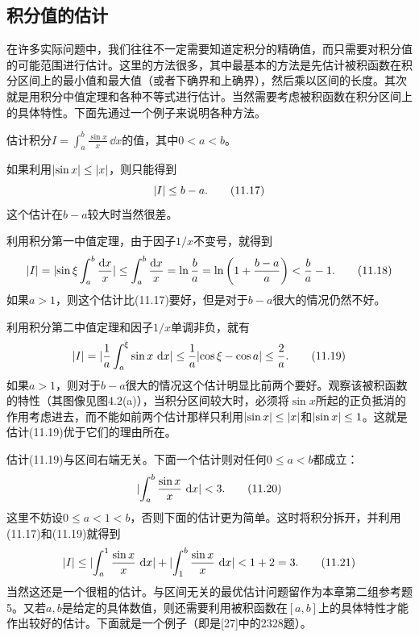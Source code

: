 \subsection{积分值的估计}

在许多实际问题中，我们往往不一定需要知道定积分的精确值，而只需要对积分值的可能范围进行估计。这里的方法很多，其中最基本的方法是先估计被积函数在积分区间上的最小值和最大值（或者下确界和上确界），然后乘以区间的长度。其次就是用积分中值定理和各种不等式进行估计。当然需要考虑被积函数在积分区间上的具体特性。下面先通过一个例子来说明各种方法。

\begin{xexample}[11.3.1]
估计积分$I=\int_a^b\frac{\sin x}{x}\,\dd x$的值，其中$0<a<b$。
\end{xexample}
\begin{xsolution}
如果利用$\lvert\sin x\rvert\le\lvert x\rvert$，则只能得到
\begin{equation}
  \lvert I\rvert\le b-a.
  \tag{11.17}
  \label{eq:11.17}
\end{equation}
这个估计在$b-a$较大时当然很差。

利用积分第一中值定理，由于因子$1/x$不变号，就得到
\begin{equation}
  \lvert I\rvert=\lvert\sin\xi\int_a^b\frac{\mathop{}\!\mathrm{d} x}{x}\rvert
  \le\int_a^b\frac{\mathop{}\!\mathrm{d} x}{x}=\ln\frac ba
  =\ln\left(1+\frac{b-a}{a}\right)<\frac ba-1.
  \tag{11.18}
  \label{eq:11.18}
\end{equation}
如果$a>1$，则这个估计比(11.17)要好，但是对于$b-a$很大的情况仍然不好。

利用积分第二中值定理和因子$1/x$单调非负，就有
\begin{equation}
  \lvert I\rvert=\lvert\frac1a\int_a^\xi\sin x\,\mathop{}\!\mathrm{d} x\rvert
  \le\frac1a\lvert\cos\xi-\cos a\rvert\le\frac2a.
  \tag{11.19}
  \label{eq:11.19}
\end{equation}
如果$a>1$，则对于$b-a$很大的情况这个估计明显比前两个要好。观察该被积函数的特性（其图像见图4.2(a)），当积分区间较大时，必须将$\sin x$所起的正负抵消的作用考虑进去，而不能如前两个估计那样只利用$\lvert\sin x\rvert\le\lvert x\rvert$和$\lvert\sin x\rvert\le1$。这就是估计(11.19)优于它们的理由所在。

估计(11.19)与区间右端无关。下面一个估计则对任何$0\le a<b$都成立：
\begin{equation}
  \lvert\int_a^b\frac{\sin x}{x}\,\mathop{}\!\mathrm{d} x\rvert<3.
  \tag{11.20}
  \label{eq:11.20}
\end{equation}
这里不妨设$0\le a<1<b$，否则下面的估计更为简单。这时将积分拆开，并利用(11.17)和(11.19)就得到
\begin{equation}
  \lvert I\rvert\le\lvert\int_a^1\frac{\sin x}{x}\,\mathop{}\!\mathrm{d} x\rvert
  +\lvert\int_1^b\frac{\sin x}{x}\,\mathop{}\!\mathrm{d} x\rvert<1+2=3.
  \tag{11.21}
  \label{eq:11.21}
\end{equation}
当然这还是一个很粗的估计。与区间无关的最优估计问题留作为本章第二组参考题5。又若$a,b$是给定的具体数值，则还需要利用被积函数在$[a,b]$上的具体特性才能作出较好的估计。下面就是一个例子（即是[27]中的2328题）。
\end{xsolution}

